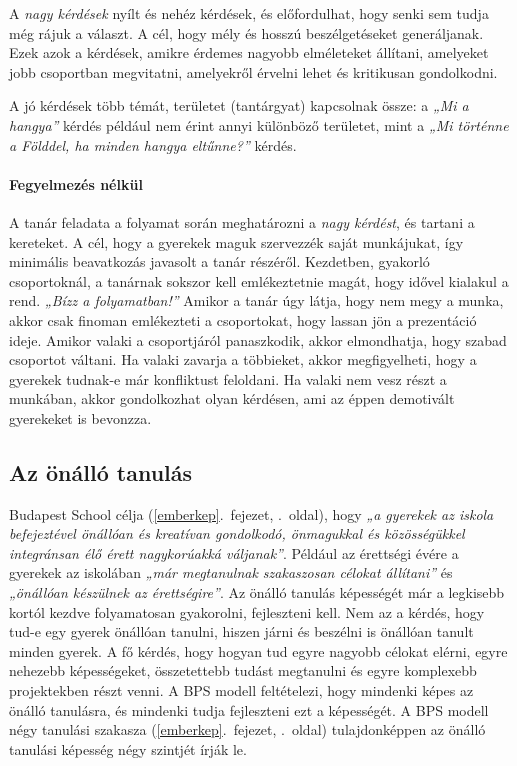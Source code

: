 A \emph{nagy kérdések} nyílt és nehéz kérdések, és előfordulhat, hogy
senki sem tudja még rájuk a választ. A cél, hogy mély és hosszú
beszélgetéseket generáljanak. Ezek azok a kérdések, amikre érdemes
nagyobb elméleteket állítani, amelyeket jobb csoportban megvitatni,
amelyekről érvelni lehet és kritikusan gondolkodni.

A jó kérdések több témát, területet (tantárgyat) kapcsolnak össze: a
\emph{„Mi a hangya''} kérdés például nem érint annyi különböző területet,
mint a \emph{„Mi történne a Földdel, ha minden hangya eltűnne?''} kérdés.

\hypertarget{fegyelmezes-nelkul}{%
\paragraph{Fegyelmezés nélkül}\label{fegyelmezes-nelkul}}

A tanár feladata a folyamat során meghatározni a \emph{nagy kérdést}, és
tartani a kereteket. A cél, hogy a gyerekek maguk szervezzék saját
munkájukat, így minimális beavatkozás javasolt a tanár részéről.
Kezdetben, gyakorló csoportoknál, a tanárnak sokszor kell emlékeztetnie
magát, hogy idővel kialakul a rend. \emph{„Bízz a folyamatban!''} Amikor
a tanár úgy látja, hogy nem megy a munka, akkor csak finoman emlékezteti
a csoportokat, hogy lassan jön a prezentáció ideje. Amikor valaki a
csoportjáról panaszkodik, akkor elmondhatja, hogy szabad csoportot
váltani. Ha valaki zavarja a többieket, akkor megfigyelheti, hogy a
gyerekek tudnak-e már konfliktust feloldani. Ha valaki nem vesz részt a
munkában, akkor gondolkozhat olyan kérdésen, ami az éppen demotivált
gyerekeket is bevonzza.

\hypertarget{az-onallo-tanulas}{%
\subsection{Az önálló tanulás}\label{az-onallo-tanulas}}

Budapest School
célja (\ref{emberkep}.~fejezet, \pageref{emberkep}.~oldal), hogy
\emph{„a gyerekek az iskola befejeztével önállóan és kreatívan gondolkodó,
önmagukkal és közösségükkel integránsan élő érett nagykorúakká
váljanak''}. Például az érettségi évére a gyerekek az iskolában
\emph{„már megtanulnak szakaszosan célokat állítani''} és \emph{„önállóan
készülnek az érettségire''}. Az önálló tanulás képességét már a legkisebb
kortól kezdve folyamatosan gyakorolni, fejleszteni kell. Nem az a
kérdés, hogy tud-e egy gyerek önállóan tanulni, hiszen járni és beszélni
is önállóan tanult minden gyerek. A fő kérdés, hogy hogyan tud egyre
nagyobb célokat elérni, egyre nehezebb képességeket, összetettebb tudást
megtanulni és egyre komplexebb projektekben részt venni. A BPS modell
feltételezi, hogy mindenki képes az önálló tanulásra, és mindenki tudja
fejleszteni ezt a képességét. A BPS modell
négy tanulási szakasza (\ref{emberkep}.~fejezet, \pageref{emberkep}.~oldal)
tulajdonképpen az önálló tanulási képesség négy szintjét írják le.

